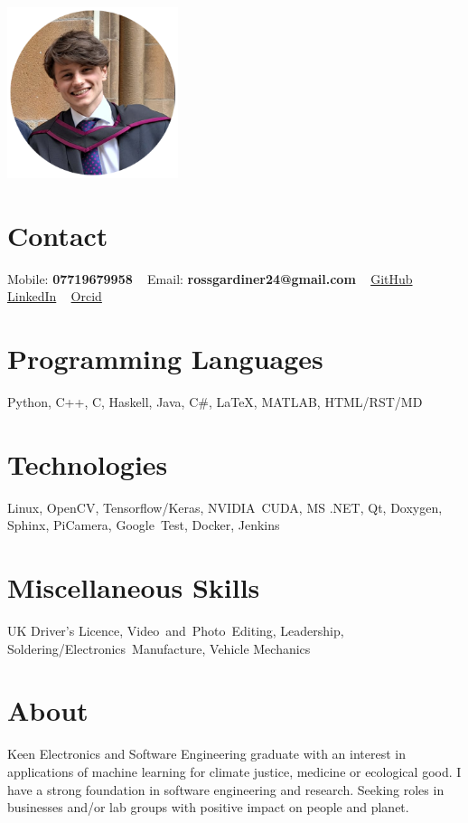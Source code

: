 \documentclass[]{cv-style}     %
\begin{document}
\lastupdated

\begin{aside}
\includegraphics[width=5cm]{g2-cropped}
%
\section{Contact}
Mobile: \textbf{07719679958}
~
Email: \textbf{rossgardiner24@gmail.com}
~
\href{https://github.com/rossGardiner}{GitHub} 
~
\href{https://www.linkedin.com/in/ross-g/}{LinkedIn}
~ 
\href{https://orcid.org/0000-0001-5633-1317}{Orcid}

%

\section{Programming Languages}
Python, C++, C, Haskell, Java, C\#, \LaTeX, MATLAB, HTML/RST/MD
%
\section{Technologies}
Linux, OpenCV, Tensorflow/Keras, NVIDIA~CUDA, MS .NET, Qt, Doxygen, Sphinx, PiCamera, Google~Test, Docker, Jenkins
\section{Miscellaneous Skills}
UK Driver's Licence, Video~and~Photo~Editing, Leadership, 
Soldering/Electronics~Manufacture, Vehicle Mechanics
%
%
\end{aside}
\vspace{0.2cm}
\section{About}
  \vspace{-0.2cm}
Keen Electronics and Software Engineering graduate with an interest in applications of machine learning for climate justice, medicine or ecological good. I have a strong foundation in software engineering and research. Seeking roles in businesses and/or lab groups with positive impact on people and planet. 
\end{document}
